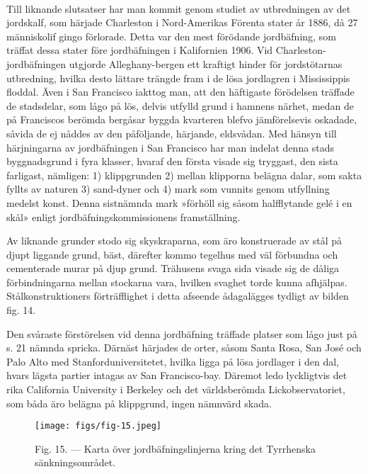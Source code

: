 \documentclass[a4paper, 12pt, oneside, swedish]{article}
\begin{document}
\paragraph{}
Till liknande slutsatser har man kommit genom studiet av utbredningen av det jordskalf, som härjade Charleston i Nord-Amerikas Förenta stater år 1886, då 27 människolif gingo förlorade. Detta var den mest förödande jordbäfning, som träffat dessa stater före jordbäfningen i Kalifornien 1906. Vid Charleston-jordbäfningen utgjorde Alleghany-bergen ett kraftigt hinder för jordstötarnas utbredning, hvilka desto lättare trängde fram i de lösa jordlagren i Mississippis floddal. Även i San Francisco iakttog man, att den häftigaste förödelsen träffade de stadsdelar, som lågo på lös, delvis utfylld grund i hamnens närhet, medan de på Franciscos berömda bergåsar byggda kvarteren blefvo jämförelsevis oskadade, såvida de ej nåddes av den påföljande, härjande, eldsvådan. Med hänsyn till härjningarna av jordbäfningen i San Francisco har man indelat denna stads byggnadsgrund i fyra klasser, hvaraf den första visade sig tryggast, den sista farligast, nämligen: 1) klippgrunden 2) mellan klipporna belägna dalar, som sakta fyllts av naturen 3) sand-dyner och 4) mark som vunnits genom utfyllning medelst konst. Denna sistnämnda mark »förhöll sig såsom halfflytande gelé i en skål» enligt jordbäfningskommissionens framställning.

Av liknande grunder stodo sig skyskraparna, som äro konstruerade av stål på djupt liggande grund, bäst, därefter kommo tegelhus med väl förbundna och cementerade murar på djup grund. Trähusens svaga sida visade sig de dåliga förbindningarna mellan stockarna vara, hvilken svaghet torde kunna afhjälpas. Stålkonstruktioners förträfflighet i detta afseende ådagalägges tydligt av bilden fig. 14.

Den svåraste förstörelsen vid denna jordbäfning träffade platser som lågo just på s. 21 nämnda spricka. Därnäst härjades de orter, såsom Santa Rosa, San José och Palo Alto med Stanforduniversitetet, hvilka ligga på lösa jordlager i den dal, hvars lägsta partier intagas av San Francisco-bay. Däremot ledo lyckligtvis det rika California University i Berkeley och det världsberömda Lickobservatoriet, som båda äro belägna på klippgrund, ingen nämnvärd skada.

\begin{figure}[H]
\centering
\texttt{[image: figs/fig-15.jpeg]}
\caption{Fig. 15. --- Karta över jordbäfningslinjerna kring det Tyrrhenska sänkningsområdet.}
\end{figure}
\end{document}
